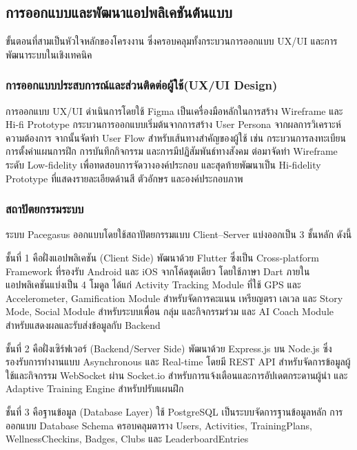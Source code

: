 \subsection{การออกแบบและพัฒนาแอปพลิเคชันต้นแบบ}

ขั้นตอนที่สามเป็นหัวใจหลักของโครงงาน ซึ่งครอบคลุมทั้งกระบวนการออกแบบ UX/UI และการพัฒนาระบบในเชิงเทคนิค

\subsubsection{การออกแบบประสบการณ์และส่วนติดต่อผู้ใช้(UX/UI Design)}

การออกแบบ UX/UI ดำเนินการโดยใช้ Figma เป็นเครื่องมือหลักในการสร้าง Wireframe และ Hi-fi Prototype กระบวนการออกแบบเริ่มต้นจากการสร้าง User Persona จากผลการวิเคราะห์ความต้องการ จากนั้นจัดทำ User Flow สำหรับเส้นทางสำคัญของผู้ใช้ เช่น กระบวนการลงทะเบียน การตั้งค่าแผนการฝึก การบันทึกกิจกรรม และการมีปฏิสัมพันธ์ทางสังคม ต่อมาจัดทำ Wireframe ระดับ Low-fidelity เพื่อทดสอบการจัดวางองค์ประกอบ และสุดท้ายพัฒนาเป็น Hi-fidelity Prototype ที่แสดงรายละเอียดด้านสี ตัวอักษร และองค์ประกอบภาพ

\subsubsection{สถาปัตยกรรมระบบ}

ระบบ Pacegasus ออกแบบโดยใช้สถาปัตยกรรมแบบ Client--Server แบ่งออกเป็น 3 ชั้นหลัก ดังนี้

ชั้นที่ 1 คือฝั่งแอปพลิเคชัน (Client Side) พัฒนาด้วย Flutter ซึ่งเป็น Cross-platform Framework ที่รองรับ Android และ iOS จากโค้ดชุดเดียว โดยใช้ภาษา Dart ภายในแอปพลิเคชันแบ่งเป็น 4 โมดูล ได้แก่ Activity Tracking Module ที่ใช้ GPS และ Accelerometer, Gamification Module สำหรับจัดการคะแนน เหรียญตรา เลเวล และ Story Mode, Social Module สำหรับระบบเพื่อน กลุ่ม และกิจกรรมร่วม และ AI Coach Module สำหรับแสดงผลและรับส่งข้อมูลกับ Backend

ชั้นที่ 2 คือฝั่งเซิร์ฟเวอร์ (Backend/Server Side) พัฒนาด้วย Express.js บน Node.js ซึ่งรองรับการทำงานแบบ Asynchronous และ Real-time โดยมี REST API สำหรับจัดการข้อมูลผู้ใช้และกิจกรรม WebSocket ผ่าน Socket.io สำหรับการแจ้งเตือนและการอัปเดตกระดานผู้นำ และ Adaptive Training Engine สำหรับปรับแผนฝึก

ชั้นที่ 3 คือฐานข้อมูล (Database Layer) ใช้ PostgreSQL เป็นระบบจัดการฐานข้อมูลหลัก การออกแบบ Database Schema ครอบคลุมตาราง Users, Activities, TrainingPlans, WellnessCheckins, Badges, Clubs และ LeaderboardEntries

